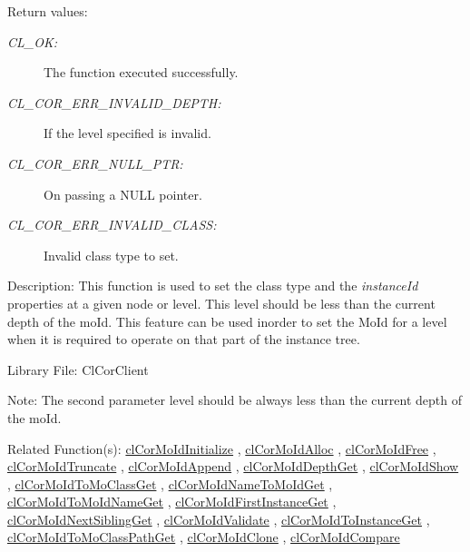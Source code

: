 \begin{Desc}
\item[Return values:]
\begin{description}
\item[{\em CL\_\-OK:}]The function executed successfully. \item[{\em CL\_\-COR\_\-ERR\_\-INVALID\_\-DEPTH:}]If the level specified is invalid. \item[{\em CL\_\-COR\_\-ERR\_\-NULL\_\-PTR:}]On passing a NULL pointer. \item[{\em CL\_\-COR\_\-ERR\_\-INVALID\_\-CLASS:}]Invalid class type to set.\end{description}
\end{Desc}
\begin{Desc}
\item[Description:]This function is used to set the class type and the {\em instance\-Id\/} properties at a given node or level. This level should be less than the current depth of the mo\-Id. This feature can be used inorder to set the Mo\-Id for a level when it is required to operate on that part of the instance tree.\end{Desc}
\begin{Desc}
\item[Library File:]Cl\-Cor\-Client\end{Desc}
\begin{Desc}
\item[Note:]The second parameter level should be always less than the current depth of the mo\-Id.\end{Desc}
\begin{Desc}
\item[Related Function(s):]\hyperlink{group__group13}{cl\-Cor\-Mo\-Id\-Initialize} , \hyperlink{group__group13}{cl\-Cor\-Mo\-Id\-Alloc} , \hyperlink{group__group13}{cl\-Cor\-Mo\-Id\-Free} , \hyperlink{group__group13}{cl\-Cor\-Mo\-Id\-Truncate} , \hyperlink{group__group13}{cl\-Cor\-Mo\-Id\-Append} , \hyperlink{group__group13}{cl\-Cor\-Mo\-Id\-Depth\-Get} , \hyperlink{group__group13}{cl\-Cor\-Mo\-Id\-Show} , \hyperlink{group__group13}{cl\-Cor\-Mo\-Id\-To\-Mo\-Class\-Get} , \hyperlink{group__group13}{cl\-Cor\-Mo\-Id\-Name\-To\-Mo\-Id\-Get} , \hyperlink{group__group13}{cl\-Cor\-Mo\-Id\-To\-Mo\-Id\-Name\-Get} , \hyperlink{group__group13}{cl\-Cor\-Mo\-Id\-First\-Instance\-Get} , \hyperlink{group__group13}{cl\-Cor\-Mo\-Id\-Next\-Sibling\-Get} , \hyperlink{group__group13}{cl\-Cor\-Mo\-Id\-Validate} , \hyperlink{group__group13}{cl\-Cor\-Mo\-Id\-To\-Instance\-Get} , \hyperlink{group__group13}{cl\-Cor\-Mo\-Id\-To\-Mo\-Class\-Path\-Get} , \hyperlink{group__group13}{cl\-Cor\-Mo\-Id\-Clone} , \hyperlink{group__group13}{cl\-Cor\-Mo\-Id\-Compare} \end{Desc}
